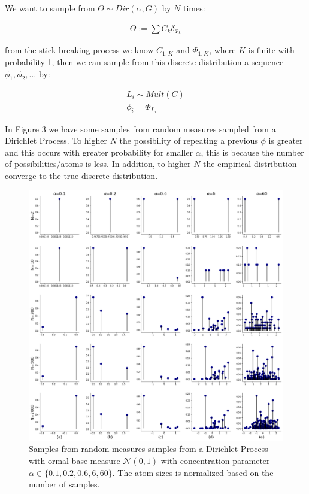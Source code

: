 \documentclass{article}
\begin{document}
We want to sample from $\Theta \sim Dir(\alpha, G)$ by $N$ times:

\begin{align}
\Theta := \sum C_{k}\delta_{\Phi_{k}}
\end{align}

from the stick-breaking process we know $C_{1:K}$ and $\Phi_{1:K}$, where $K$ is finite with probability 1, then we can sample from this discrete distribution a sequence $\phi_{1}, \phi_{2}, \ldots$ by:

\begin{align}
L_{i}\sim Mult(C)\\
\phi_{i} = \Phi_{L_{i}}
\end{align}

In Figure 3 we have some samples from random measures sampled from a Dirichlet Process. To higher $N$ the possibility of repeating a previous $\phi$ is greater and this occurs with greater probability for smaller $\alpha$, this is because the number of possibilities/atoms is less. In addition, to higher $N$ the empirical distribution converge to the true discrete distribution.\\

\begin{figure}[h]
\includegraphics[scale=0.2]{img/g_samples.png}  
\caption{Samples from random measures samples from a Dirichlet Process with ormal base measure $\mathcal{N}(0,1)$ with concentration parameter $\alpha\in\{0.1, 0.2, 0.6, 6, 60\}$. The atom sizes is normalized based on the number of samples.}
\end{figure}
\end{document}
